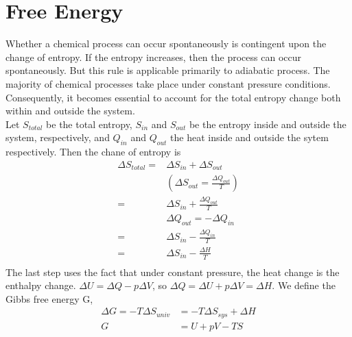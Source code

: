 \documentclass[a4paper]{article}
\begin{document}
\section{Free Energy}
Whether a chemical process can occur spontaneously is contingent upon the change of entropy.  If the entropy increases, then the process can occur spontaneously. But this rule is applicable primarily to adiabatic process. The majority of chemical processes take place under  constant pressure conditions. Consequently, it becomes essential to account for the total entropy change both within and outside the system. \\
Let $S_{total}$ be the total entropy, $S_{in}$ and  $S_{out}$ be the entropy inside and outside the system, respectively, and $Q_{in}$ and  $Q_{out}$ the heat inside and outside the sytem respectively.  Then the chane of entropy is
\begin{align*}
\Delta S_{total}  = & \Delta S_{in} + \Delta S_{out} \\
                           &   (\Delta S_{out} = \frac{\Delta Q_{out}}{T})\\
                        = & \Delta S_{in} + \frac{ \Delta Q_{out} }{T}\\
                           & \Delta Q_{out} = -\Delta Q_{in} \\
                        = &\Delta S_{in} - \frac{ \Delta Q_{in} }{T}\\
                        = & \Delta S_{in} - \frac{ \Delta H} {T}\\
\end{align*}
The last step uses the fact that under constant pressure, the heat change is the enthalpy change. $\Delta U = \Delta Q - p\Delta V$, so $\Delta Q = \Delta U + p \Delta V = \Delta H$. We define the Gibbs free energy G, 
\begin{align}
\Delta G = -T \Delta S_{univ} & = -T \Delta S_{sys} + \Delta H \\
                                 G & = U + pV - TS \\
\end{align}
\end{document}
